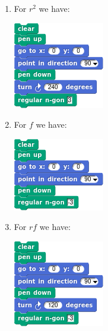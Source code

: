 \documentclass[noauthor,nooutcomes,12pt,hints]{ximera}
\begin{document}
\begin{question}
\begin{freeResponse}
\begin{enumerate}
\begin{center}
      \end{center}
    \item For $r^2$ we have:
      \begin{center}
        \includegraphics[width=.3\textwidth]{r2TriSCRIPT.png}   \qquad {}
      \end{center}
    \item For $f$ we have:
      \begin{center}
        \includegraphics[width=.3\textwidth]{fTriSCRIPT.png}   \qquad {}
      \end{center}
    \item For $rf$ we have:
      \begin{center}
        \includegraphics[width=.3\textwidth]{rfTriSCRIPT.png}   \qquad {}

\end{center}
\end{enumerate}
\end{freeResponse}
\end{question}
\end{document}
